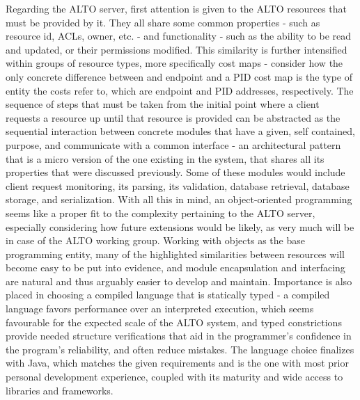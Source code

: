     Regarding the ALTO server, first attention is given to the ALTO resources that must be provided by it.
    They all share some common properties - such as resource id, ACLs, owner, etc. - and functionality - such as the ability to be read and updated, or their permissions modified.
    This similarity is further intensified within groups of resource types, more specifically cost maps - consider how the only concrete difference between and endpoint and a PID cost map is the type of entity the costs refer to, which are endpoint and PID addresses, respectively.
    The sequence of steps that must be taken from the initial point where a client requests a resource up until that resource is provided can be abstracted as the sequential interaction between concrete modules that have a given, self contained, purpose, and communicate with a common interface - an architectural pattern that is a micro version of the one existing in the system, that shares all its properties that were discussed previously.
    Some of these modules would include client request monitoring, its parsing, its validation, database retrieval, database storage, and serialization.
    With all this in mind, an object-oriented programming seems like a proper fit to the complexity pertaining to the ALTO server, especially considering how future extensions would be likely, as very much will be in case of the ALTO working group.
    Working with objects as the base programming entity, many of the highlighted similarities between resources will become easy to be put into evidence, and module encapsulation and interfacing are natural and thus arguably easier to develop and maintain.
    Importance is also placed in choosing a compiled language that is statically typed - a compiled language favors performance over an interpreted execution, which seems favourable for the expected scale of the ALTO system, and typed constrictions provide needed structure verifications that aid in the programmer's confidence in the program's reliability, and often reduce mistakes.
    The language choice finalizes with Java, which matches the given requirements and is the one with most prior personal development experience, coupled with its maturity and wide access to libraries and frameworks.

